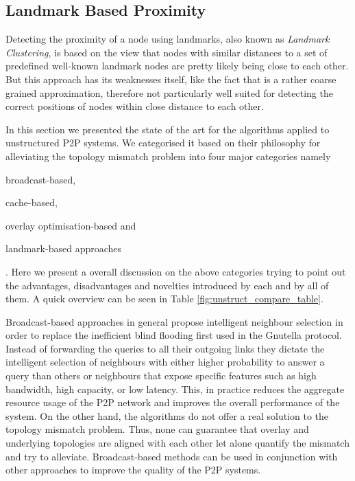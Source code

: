 

\subsection{Landmark Based Proximity}\label{sec:landmark}

Detecting the proximity of a node using landmarks, also known as
\textit{Landmark Clustering}, is based on the view that nodes with similar
distances to a set of predefined well-known landmark nodes are pretty likely
being close to each other. But this approach has its weaknesses itself, like the
fact that is a rather coarse grained approximation, therefore not particularly
well suited for detecting the correct positions of nodes within close distance
to each other.




In this section we presented the state of the art for the algorithms applied to
unstructured P2P systems. We categorised it based on their philosophy for
alleviating the topology mismatch problem into four major categories namely
\begin{inparaenum}
  \item broadcast-based,
  \item cache-based,
  \item overlay optimisation-based and
  \item landmark-based approaches
\end{inparaenum}
. Here we present a overall discussion on the above categories trying to point
out the advantages, disadvantages and novelties introduced by each and by all of
them. A quick overview can be seen in Table \ref{fig:unstruct_compare_table}.

Broadcast-based approaches in general propose intelligent neighbour selection in
order to replace the inefficient blind flooding first used in the Gnutella
protocol. Instead of forwarding the queries to all their outgoing links they
dictate the intelligent selection of neighbours with either higher probability
to answer a query than others or neighbours  that expose specific features such
as high bandwidth, high capacity, or low latency. This, in practice reduces the
aggregate resource usage of the P2P network and improves the overall performance
of the system. On the other hand, the algorithms do not offer a real solution to
the topology mismatch problem. Thus, none can guarantee that overlay and
underlying topologies are aligned with each other let alone quantify the
mismatch and try to alleviate. Broadcast-based methods can be used in
conjunction with other approaches to improve the quality of the P2P systems.

